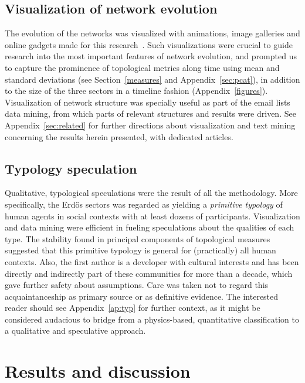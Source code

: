 \documentclass[%
 aip,
 jmp,%
 amsmath,amssymb,
 reprint,%
]{revtex4-1}
\begin{document}
\subsection{Visualization of network evolution}\label{sec:viz}
The evolution of the networks was visualized with animations, image galleries and online gadgets made for this research~\cite{animacoes,galGMANE,appGMANE}. Such visualizations were crucial to guide research into the most important features of network evolution, and prompted us to capture the prominence of topological metrics along time using mean and standard deviations (see Section~\ref{measures} and Appendix~\ref{sec:pcat}), in addition to the size of the three sectors in a timeline fashion (Appendix~\ref{figures}). Visualization of network structure was specially useful as part of the email lists data mining, from which parts of relevant structures and results were driven. See Appendix~\ref{sec:related} for further directions about visualization and text mining concerning the results herein presented, with dedicated articles.

\subsection{Typology speculation}\label{subsec:typ}
Qualitative, typological speculations were the result of all the methodology. More specifically, the Erd\"os sectors was regarded as yielding a \emph{primitive typology} of human agents in social contexts with at least dozens of participants. 
Visualization and data mining were efficient in fueling speculations about the qualities of each type. 
The stability found in principal components of topological measures suggested that this primitive typology is general for (practically) all human contexts.
Also, the first author is a developer with cultural interests and has been directly and indirectly part of these communities for more than a decade, which gave further safety about assumptions. Care was taken not to regard this acquaintanceship as primary source or as definitive evidence.
The interested reader should see Appendix~\ref{ap:typ} for further context, 
as it might be considered audacious to bridge from a physics-based, 
quantitative classification to a qualitative and speculative approach.

\section{Results and discussion}\label{sec:results}
\end{document}
